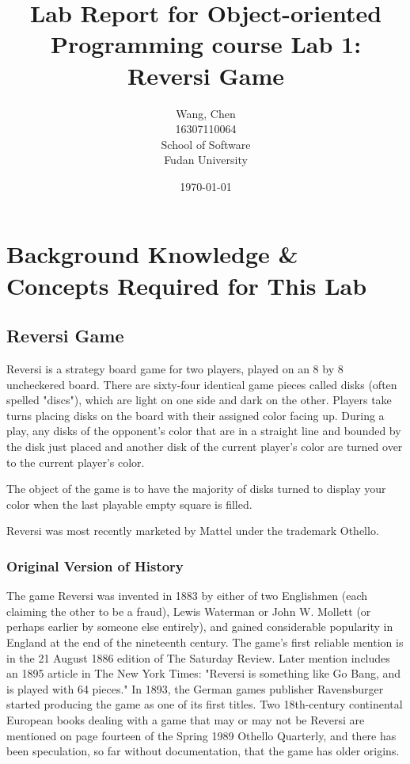 \documentclass[a4paper]{report}
\title{Lab Report for Object-oriented Programming course \newline
 Lab 1: Reversi Game}
\author{Wang, Chen \\ 16307110064 \\ School of Software\\ Fudan University}
\date{\today}
\begin{document}
\maketitle

\tableofcontents

\chapter{Background Knowledge \& Concepts Required for This Lab}
\section{Reversi Game}
Reversi is a strategy board game for two players, played on an 8 by 8 uncheckered board. There are sixty-four identical game pieces called disks (often spelled "discs"), which are light on one side and dark on the other. Players take turns placing disks on the board with their assigned color facing up. During a play, any disks of the opponent's color that are in a straight line and bounded by the disk just placed and another disk of the current player's color are turned over to the current player's color. 
\par
The object of the game is to have the majority of disks turned to display your color when the last playable empty square is filled. 
\par
Reversi was most recently marketed by Mattel under the trademark Othello. 

\subsection{Original Version of History}
The game Reversi was invented in 1883 by either of two Englishmen (each claiming the other to be a fraud), Lewis Waterman or John W. Mollett (or perhaps earlier by someone else entirely), and gained considerable popularity in England at the end of the nineteenth century. The game's first reliable mention is in the 21 August 1886 edition of The Saturday Review. Later mention includes an 1895 article in The New York Times: "Reversi is something like Go Bang, and is played with 64 pieces." In 1893, the German games publisher Ravensburger started producing the game as one of its first titles. Two 18th-century continental European books dealing with a game that may or may not be Reversi are mentioned on page fourteen of the Spring 1989 Othello Quarterly, and there has been speculation, so far without documentation, that the game has older origins.
\end{document}
